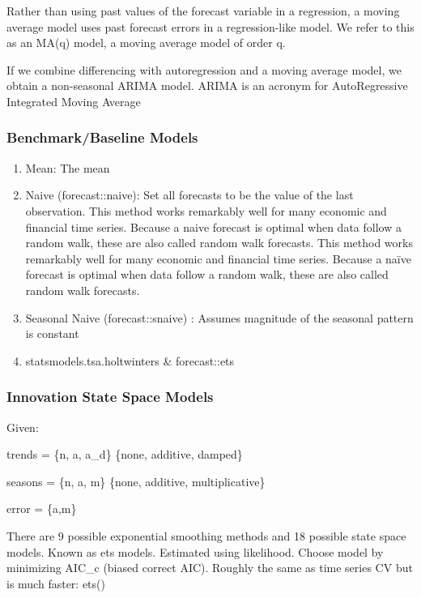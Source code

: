 \documentclass[]{book}
\begin{document}
Rather than using past values of the forecast variable in a regression,
a moving average model uses past forecast errors in a regression-like
model. We refer to this as an MA(q) model, a moving average model of
order q.

If we combine differencing with autoregression and a moving average
model, we obtain a non-seasonal ARIMA model. ARIMA is an acronym for
AutoRegressive Integrated Moving Average

\subsubsection{Benchmark/Baseline
Models}\label{benchmarkbaseline-models}

\begin{enumerate}
\def\labelenumi{\arabic{enumi}.}
\setcounter{enumi}{-1}
\item
  Mean: The mean
\item
  Naive (forecast::naive): Set all forecasts to be the value of the last
  observation. This method works remarkably well for many economic and
  financial time series. Because a naive forecast is optimal when data
  follow a random walk, these are also called random walk forecasts.
  This method works remarkably well for many economic and financial time
  series. Because a naïve forecast is optimal when data follow a random
  walk, these are also called random walk forecasts.
\item
  Seasonal Naive (forecast::snaive) : Assumes magnitude of the seasonal
  pattern is constant
\item
  statsmodels.tsa.holtwinters \& forecast::ets
\end{enumerate}

\subsubsection{Innovation State Space
Models}\label{innovation-state-space-models}

Given:

trends = \{n, a, a\_d\} \{none, additive, damped\}

seasons = \{n, a, m\} \{none, additive, multiplicative\}

error = \{a,m\}

There are 9 possible exponential smoothing methods and 18 possible state
space models. Known as ets models. Estimated using likelihood. Choose
model by minimizing AIC\_c (biased correct AIC). Roughly the same as
time series CV but is much faster: ets()
\end{document}
